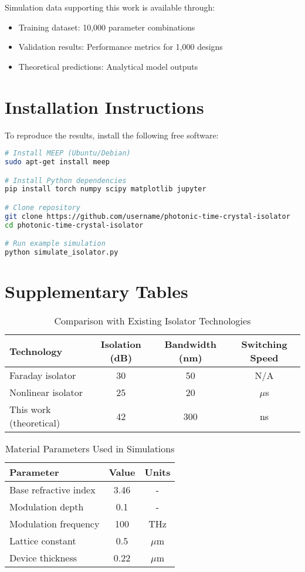 \documentclass[11pt]{article}
\begin{document}
Simulation data supporting this work is available through:
\begin{itemize}
    \item Training dataset: 10,000 parameter combinations
    \item Validation results: Performance metrics for 1,000 designs
    \item Theoretical predictions: Analytical model outputs
\end{itemize}

\section{Installation Instructions}

To reproduce the results, install the following free software:

\begin{lstlisting}[language=bash]
# Install MEEP (Ubuntu/Debian)
sudo apt-get install meep

# Install Python dependencies
pip install torch numpy scipy matplotlib jupyter

# Clone repository
git clone https://github.com/username/photonic-time-crystal-isolator
cd photonic-time-crystal-isolator

# Run example simulation
python simulate_isolator.py
\end{lstlisting}

\section{Supplementary Tables}

\begin{table}[h]
\centering
\caption{Comparison with Existing Isolator Technologies}
\label{tab:comparison}
\begin{tabular}{lccc}
\toprule
Technology & Isolation (dB) & Bandwidth (nm) & Switching Speed \\
\midrule
Faraday isolator & 30 & 50 & N/A \\
Nonlinear isolator & 25 & 20 & $\mu$s \\
This work (theoretical) & 42 & 300 & ns \\
\bottomrule
\end{tabular}
\end{table}

\begin{table}[h]
\centering
\caption{Material Parameters Used in Simulations}
\label{tab:materials}
\begin{tabular}{lcc}
\toprule
Parameter & Value & Units \\
\midrule
Base refractive index & 3.46 & - \\
Modulation depth & 0.1 & - \\
Modulation frequency & 100 & THz \\
Lattice constant & 0.5 & $\mu$m \\
Device thickness & 0.22 & $\mu$m \\
\bottomrule
\end{tabular}
\end{table}
\end{document}
